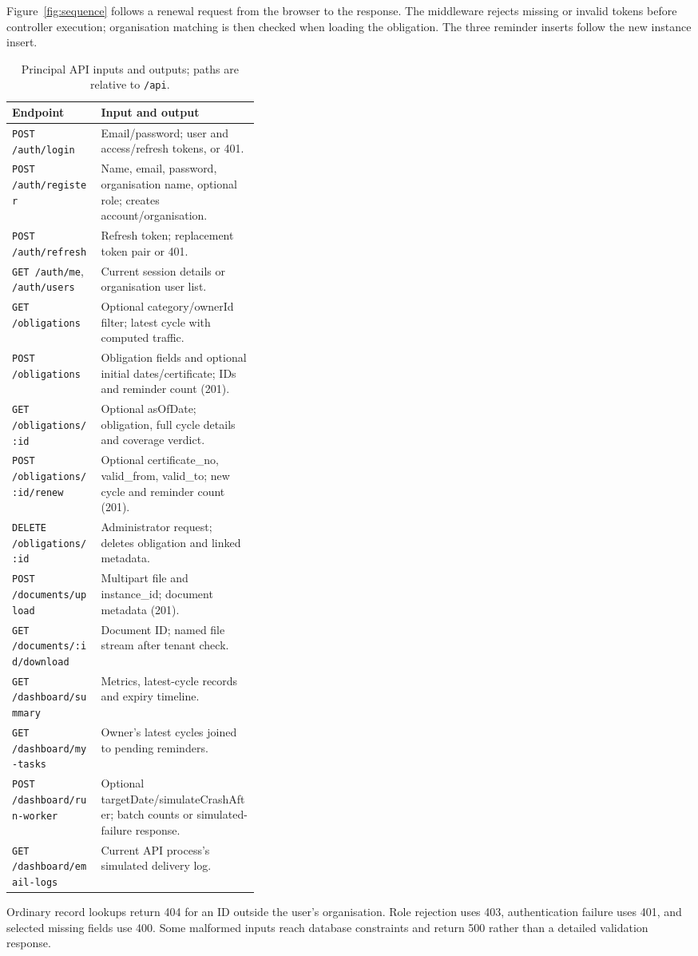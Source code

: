 Figure~\ref{fig:sequence} follows a renewal request from the browser to the response. The middleware rejects missing or invalid tokens before controller execution; organisation matching is then checked when loading the obligation. The three reminder inserts follow the new instance insert.

\begin{table}[H]\centering\footnotesize
\begin{tabularx}{\linewidth}{@{}>{\raggedright\arraybackslash}p{0.36\linewidth}Y@{}}\toprule
Endpoint & Input and output\\\midrule
\texttt{POST /auth/login} & Email/password; user and access/refresh tokens, or 401.\\
\texttt{POST /auth/register} & Name, email, password, organisation name, optional role; creates account/organisation.\\
\texttt{POST /auth/refresh} & Refresh token; replacement token pair or 401.\\
\texttt{GET /auth/me}, \texttt{/auth/users} & Current session details or organisation user list.\\
\texttt{GET /obligations} & Optional category/ownerId filter; latest cycle with computed traffic.\\
\texttt{POST /obligations} & Obligation fields and optional initial dates/certificate; IDs and reminder count (201).\\
\texttt{GET /obligations/:id} & Optional asOfDate; obligation, full cycle details and coverage verdict.\\
\texttt{POST /obligations/:id/renew} & Optional certificate\_no, valid\_from, valid\_to; new cycle and reminder count (201).\\
\texttt{DELETE /obligations/:id} & Administrator request; deletes obligation and linked metadata.\\
\texttt{POST /documents/upload} & Multipart file and instance\_id; document metadata (201).\\
\texttt{GET /documents/:id/download} & Document ID; named file stream after tenant check.\\
\texttt{GET /dashboard/summary} & Metrics, latest-cycle records and expiry timeline.\\
\texttt{GET /dashboard/my-tasks} & Owner's latest cycles joined to pending reminders.\\
\texttt{POST /dashboard/run-worker} & Optional targetDate/simulateCrashAfter; batch counts or simulated-failure response.\\
\texttt{GET /dashboard/email-logs} & Current API process's simulated delivery log.\\\bottomrule
\end{tabularx}
\caption{Principal API inputs and outputs; paths are relative to \texttt{/api}.}\label{tab:api}
\end{table}
Ordinary record lookups return 404 for an ID outside the user's organisation. Role rejection uses 403, authentication failure uses 401, and selected missing fields use 400. Some malformed inputs reach database constraints and return 500 rather than a detailed validation response.

